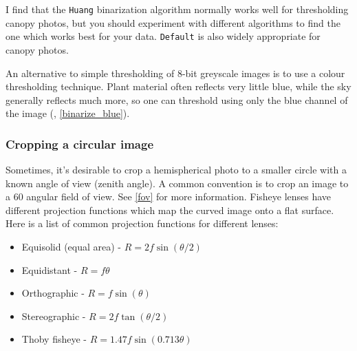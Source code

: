 \documentclass[11pt,a4paper]{article}
\newcommand\file[1]{\texttt{\underline{#1}}}  %
\begin{document}
\begin{minipage}{\linewidth}

\end{minipage}

I find that the \verb|Huang| \citep{Huang1995} binarization algorithm normally works well for thresholding canopy photos, but you should experiment with different algorithms to find the one which works best for your data. \verb|Default| is also widely appropriate for canopy photos.

An alternative to simple thresholding of 8-bit greyscale images is to use a colour thresholding technique. Plant material often reflects very little blue, while the sky generally reflects much more, so one can threshold using only the blue channel of the image (\citealt{Brusa2014}, \autoref{binarize_blue}).

\begin{minipage}{\linewidth}

\end{minipage}

\subsubsection{Cropping a circular image} \label{circle}

Sometimes, it's desirable to crop a hemispherical photo to a smaller circle with a known angle of view (zenith angle). A common convention is to crop an image to a 60\textdegree{} angular field of view. See \autoref{fov} for more information. Fisheye lenses have different projection functions which map the curved image onto a flat surface. Here is a list of common projection functions for different lenses:

\begin{itemize}
	\item{Equisolid (equal area) - $R = 2f\sin{(\theta/2)}$}
	\item{Equidistant - $R = f\theta$}
	\item{Orthographic - $R = f\sin{(\theta)}$}
	\item{Stereographic - $R = 2f\tan{(\theta/2)}$}
	\item{Thoby fisheye - $R = 1.47f\sin{(0.713\theta)}$}
\end{itemize}
\end{document}
